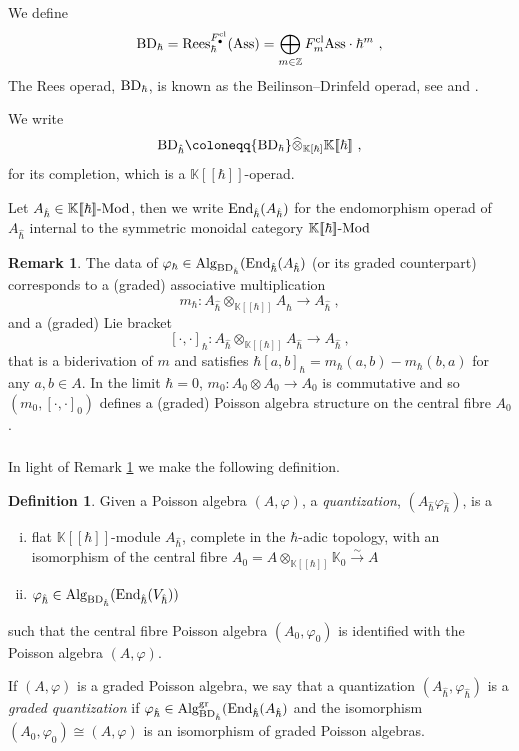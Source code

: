 \documentclass[11pt]{amsart}
\numberwithin{equation}{section}
\theoremstyle{definition}
\newtheorem{defn}[theo]{Definition}
\newtheorem{rmk}[theo]{Remark}
\newcommand{\bb}{\mathbb}
\newcommand{\Rees}{{\textup{Rees}}}
\newcommand{\OEnd}{{\textup{End}}}
\newcommand{\fph}{{[\![\hbar]\!]}}
\newcommand{\gd}{{\textup{gr}}}
\newcommand{\Mod}{{\textup{-Mod}}}
\newcommand{\ik}{{\bb K}}
\newcommand{\BDh}{{\textup{BD}_\hbar}}
\newcommand{\BDhat}{{\textup{BD}_{\hat{\hbar}}}}
\newcommand{\Alg}{{\textup{Alg}}}
\newcommand{\Ass}{{\textup{Ass}}}
\newcommand{\0}{{\textbf{0}}}
\newcommand{\cl}{{\text{cl}}}
\newcommand{\Z}{\bb Z}
\begin{document}
We define
\begin{equation}\label{eq:BD dfn}
\BDh = \Rees_\hbar^{F^\cl_\bullet}(\Ass) = \bigoplus_{m\in \Z} F_m^\cl \Ass \cdot \hbar^m ~,
\end{equation}
The Rees operad, $\BDh$, is known as the Beilinson--Drinfeld operad, see \cite{Melani2018} and \cite{CosGw}.

We write 
\[
\BDhat \coloneqq \BDh\widehat{\otimes}_{\ik[\hbar]}\ik\fph~,
\]
for its completion, which is a $\ik\fph$-operad.

Let $A_{\hat \hbar}\in \ik\fph\Mod$, then we write $\OEnd_{\hat \hbar}(A_{\hat \hbar})$ for the endomorphism operad of $A_{\hat \hbar}$ internal to the symmetric monoidal category $\ik\fph\Mod$
\begin{rmk}\label{rmk:BD-algebras concretely}
	The data of $\varphi_\hbar \in \Alg_{\BDhat}(\OEnd_{\hat \hbar}(A_{\hat \hbar})$ (or its graded counterpart) corresponds to a (graded) associative multiplication
	\[
	m_{\hbar}:A_{\hat \hbar} \otimes_{\ik\fph}A_{\hat \hbar} \rightarrow A_{\hat \hbar}~,
	\]
	and a (graded) Lie bracket 
	\[
	[\cdot,\cdot]_{\hbar}:A_{\hat \hbar}\otimes_{\ik\fph}A_{\hat \hbar} \rightarrow A_{\hat \hbar}~,
	\]
	that is a biderivation of $m$ and satisfies $\hbar[a,b]_{\hbar} = m_\hbar(a,b)-m_\hbar(b,a)$ for any $a,b\in A$. In the limit $\hbar=0$, $m_0:A_0\otimes A_0\rightarrow A_0$ is commutative and so $(m_0,[\cdot,\cdot]_{0})$ defines a (graded) Poisson algebra structure on the central fibre $A_0$.
\end{rmk}


\subsubsection{}

In light of Remark \ref{rmk:BD-algebras concretely} we make the following definition.
\begin{defn}
	Given a Poisson algebra $(A,\varphi)$, a \emph{quantization}, $(A_{\hat \hbar} \varphi_{\hat \hbar})$, is a
	\begin{enumerate}[(i)]
		\item flat $\ik\fph$-module $A_{\hat \hbar}$, complete in the $\hbar$-adic topology, with an isomorphism of the central fibre $A_0=A\otimes_{\ik\fph}\ik_0\xrightarrow{\sim} A$
		\item $\varphi_{\hat \hbar}\in \Alg_{\BDhat}(\OEnd_{\hat \hbar}(V_{\hat \hbar}))$
	\end{enumerate}
	such that the central fibre Poisson algebra $(A_0,\varphi_0)$  is identified with the Poisson algebra $(A,\varphi)$.

	If $(A,\varphi)$ is a graded Poisson algebra, we say that a quantization $(A_{\hat \hbar},\varphi_{\hat \hbar})$ is a \emph{graded quantization} if $\varphi_{\hat \hbar} \in \Alg^\gd_{\BDhat}(\OEnd_{\hat \hbar}(A_{\hat \hbar})$ and the isomorphism $(A_0,\varphi_0)\cong (A,\varphi)$ is an isomorphism of graded Poisson algebras.
\end{defn}
\end{document}
